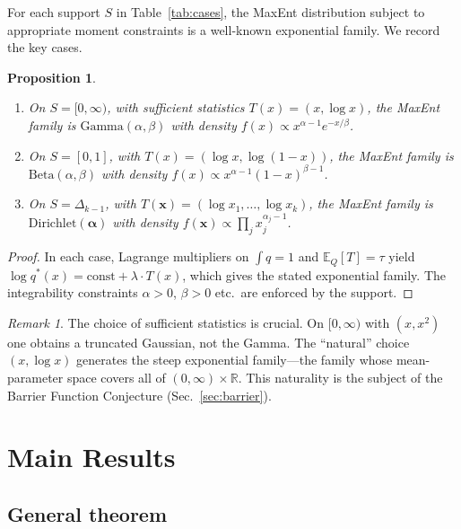 \documentclass[aps,pre,twocolumn,superscriptaddress,nofootinbib]{revtex4-2}
\newtheorem{proposition}[theorem]{Proposition}
\theoremstyle{definition}
\theoremstyle{remark}
\newtheorem{remark}[theorem]{Remark}
\newcommand{\R}{\mathbb{R}}
\newcommand{\E}{\mathbb{E}}
\begin{document}
For each support $S$ in Table~\ref{tab:cases}, the MaxEnt distribution subject
to appropriate moment constraints is a well-known exponential family.  We
record the key cases.

\begin{proposition}\label{prop:maxent}
\ %
\begin{enumerate}
\item[(i)] On $S=[0,\infty)$, with sufficient statistics $T(x)=(x,\log x)$,
the MaxEnt family is $\mathrm{Gamma}(\alpha,\beta)$ with density
$f(x)\propto x^{\alpha-1}e^{-x/\beta}$.
\item[(ii)] On $S=[0,1]$, with $T(x)=(\log x,\log(1{-}x))$, the MaxEnt
family is $\mathrm{Beta}(\alpha,\beta)$ with density
$f(x)\propto x^{\alpha-1}(1{-}x)^{\beta-1}$.
\item[(iii)] On $S=\Delta_{k-1}$, with $T(\bm{x})=(\log x_1,\ldots,\log x_k)$,
the MaxEnt family is $\mathrm{Dirichlet}(\bm{\alpha})$ with density
$f(\bm{x})\propto\prod_j x_j^{\alpha_j-1}$.
\end{enumerate}
\end{proposition}

\begin{proof}
In each case, Lagrange multipliers on $\int q=1$ and $\E_Q[T]=\tau$ yield
$\log q^*(x)=\text{const}+\lambda\cdot T(x)$, which gives the stated
exponential family.  The integrability constraints $\alpha>0$, $\beta>0$
etc.\ are enforced by the support.
\end{proof}

\begin{remark}
The choice of sufficient statistics is crucial. On $[0,\infty)$ with $(x,x^2)$
one obtains a truncated Gaussian, not the Gamma. The ``natural'' choice
$(x,\log x)$ generates the steep exponential family---the family whose
mean-parameter space covers all of $(0,\infty)\times\R$.  This naturality is
the subject of the Barrier Function Conjecture (Sec.~\ref{sec:barrier}).
\end{remark}

\section{Main Results}\label{sec:main}

\subsection{General theorem}
\end{document}

